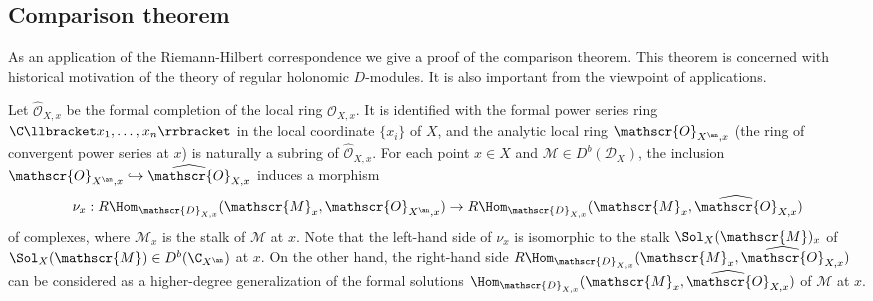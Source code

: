 \subsection{Comparison theorem}
As an application of the Riemann-Hilbert correspondence we give a proof of the comparison theorem. This theorem is concerned with historical motivation of the theory of regular holonomic $D$-modules. It is also important from the viewpoint of applications.\par
Let $\widehat{\mathscr{O}}_{X,x}$ be the formal completion of the local ring $\mathscr{O}_{X,x}$. It is identified with the formal power series ring $\C\llbracket x_1,\dots,x_n\rrbracket$ in the local coordinate $\{x_i\}$ of $X$, and the analytic local ring $\mathscr{O}_{X^{\an},x}$ (the ring of convergent power series at $x$) is naturally a subring of $\widehat{\mathscr{O}}_{X,x}$. For each point $x\in X$ and $\mathscr{M}\in D^b(\mathscr{D}_X)$, the inclusion $\mathscr{O}_{X^{\an},x}\hookrightarrow\widehat{\mathscr{O}}_{X,x}$ induces a morphism
\[\nu_x:R\Hom_{\mathscr{D}_{X,x}}(\mathscr{M}_x,\mathscr{O}_{X^{\an},x})\to R\Hom_{\mathscr{D}_{X,x}}(\mathscr{M}_x,\widehat{\mathscr{O}}_{X,x})\]
of complexes, where $\mathscr{M}_x$ is the stalk of $\mathscr{M}$ at $x$. Note that the left-hand side of $\nu_x$ is isomorphic to the stalk $\Sol_X(\mathscr{M})_x$ of $\Sol_X(\mathscr{M})\in D^b(\C_{X^{\an}})$ at $x$. On the other hand, the right-hand side $R\Hom_{\mathscr{D}_{X,x}}(\mathscr{M}_x,\widehat{\mathscr{O}}_{X,x})$ can be considered as a higher-degree generalization of the formal solutions $\Hom_{\mathscr{D}_{X,x}}(\mathscr{M}_x,\widehat{\mathscr{O}}_{X,x})$ of $\mathscr{M}$ at $x$.

